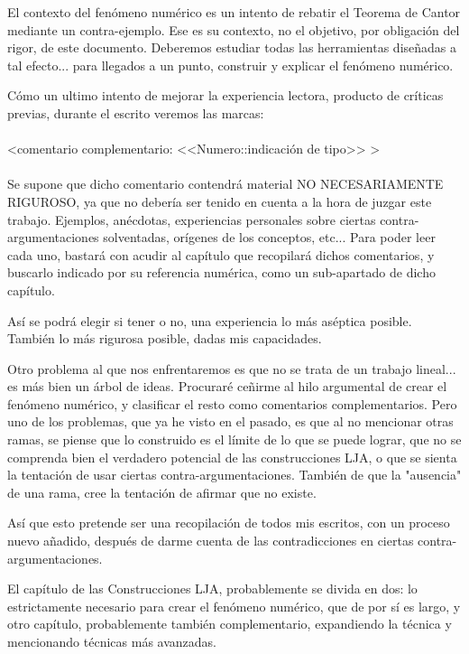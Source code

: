 El contexto del fenómeno numérico es un intento de rebatir el Teorema de Cantor mediante un contra-ejemplo. Ese es su contexto, no el objetivo, por obligación del rigor, de este documento. Deberemos estudiar todas las herramientas diseñadas a tal efecto... para llegados a un punto, construir y explicar el fenómeno numérico.

Cómo un ultimo intento de mejorar la experiencia lectora, producto de críticas previas, durante el escrito veremos las marcas:\\\\
\noindent<comentario complementario: <<Numero::indicación de tipo>> > \\\\
\noindent Se supone que dicho comentario contendrá material NO NECESARIAMENTE RIGUROSO, ya que no debería ser tenido en cuenta a la hora de juzgar este trabajo. Ejemplos, anécdotas, experiencias personales sobre ciertas contra-argumentaciones solventadas, orígenes de los conceptos, etc... Para poder leer cada uno, bastará con acudir al capítulo que recopilará dichos comentarios, y buscarlo indicado por su referencia numérica, como un sub-apartado de dicho capítulo.

Así se podrá elegir si tener o no, una experiencia lo más aséptica posible. También lo más rigurosa posible, dadas mis capacidades.

Otro problema al que nos enfrentaremos es que no se trata de un trabajo lineal... es más bien un árbol de ideas. Procuraré ceñirme al hilo argumental de crear el fenómeno numérico, y clasificar el resto como comentarios complementarios. Pero uno de los problemas, que ya he visto en el pasado, es que al no mencionar otras ramas, se piense que lo construido es el límite de lo que se puede lograr, que no se comprenda bien el verdadero potencial de las construcciones LJA, o que se sienta la tentación de usar ciertas contra-argumentaciones. También de que la "ausencia" de una rama, cree la tentación de afirmar que no existe.

Así que esto pretende ser una recopilación de todos mis escritos, con un proceso nuevo añadido, después de darme cuenta de las contradicciones en ciertas contra-argumentaciones.

El capítulo de las Construcciones LJA, probablemente se divida en dos: lo estrictamente necesario para crear el fenómeno numérico, que de por sí es largo, y otro capítulo, probablemente también complementario, expandiendo la técnica y mencionando técnicas más avanzadas.

